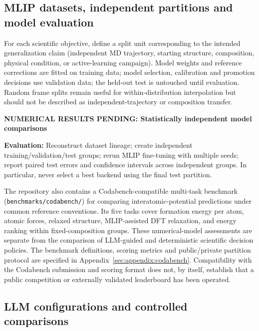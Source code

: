 \documentclass[11pt,a4paper]{article}
\newcommand{\newexperiment}[2]{\par\medskip\noindent\begingroup\color{red!80!black}\textbf{NUMERICAL RESULTS PENDING: #1}\par\noindent\textbf{Evaluation:} #2\par\endgroup\medskip}
\begin{document}
\subsection{MLIP datasets, independent partitions and model evaluation}
For each scientific objective, define a split unit corresponding to the intended generalization claim (independent MD trajectory, starting structure, composition, physical condition, or active-learning campaign). Model weights and reference corrections are fitted on training data; model selection, calibration and promotion decisions use validation data; the held-out test is untouched until evaluation. Random frame splits remain useful for within-distribution interpolation but should not be described as independent-trajectory or composition transfer.
\newexperiment{Statistically independent model comparisons}{Reconstruct dataset lineage; create independent training/validation/test groups; rerun MLIP fine-tuning with multiple seeds; report paired test errors and confidence intervals across independent groups. In particular, never select a best backend using the final test partition.}

The repository also contains a Codabench-compatible multi-task benchmark (\texttt{benchmarks/codabench/}) for comparing interatomic-potential predictions under common reference conventions. Its five tasks cover formation energy per atom, atomic forces, relaxed structure, MLIP-assisted DFT relaxation, and energy ranking within fixed-composition groups. These numerical-model assessments are separate from the comparison of LLM-guided and deterministic scientific decision policies. The benchmark definitions, scoring metrics and public/private partition protocol are specified in Appendix~\ref{sec:appendix:codabench}. Compatibility with the Codabench submission and scoring format does not, by itself, establish that a public competition or externally validated leaderboard has been operated.

\subsection{LLM configurations and controlled comparisons}
\end{document}
